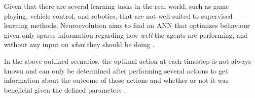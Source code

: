 





Given that there are several learning tasks in the real world, such as game playing, vehicle control, and robotics, that are not well-suited to supervised learning methods, Neuroevolution aims to find an ANN that optimizes behaviour given only sparse information regarding how \textit{well} the agents are performing, and without any input on \textit{what} they should be doing \cite{Miikkulainen2010}. 

In the above outlined scenarios, the optimal action at each timestep is not always known and can only be determined after performing several actions to get information about the outcome of those actions and whether or not it was beneficial given the defined parameters \cite{Miikkulainen2010}.

